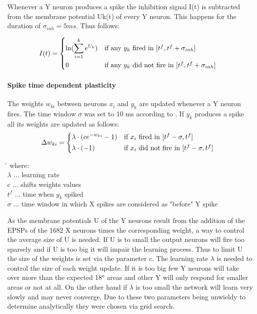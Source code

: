 Whenever a Y neuron produces a spike the inhibition signal I(t) is subtracted from the membrane potential Uk(t) of every Y neuron. This happens for the duration of $\sigma_{inh} = 5 ms$. Thus follows:

\begin{equation}
\label{eqn:iinh}
I(t) = \begin{dcases*} \ln ( \sum_{i=1}^k e^{U_k} ) & if any $y_k$ fired in $ [t^f, t^f  + \sigma_{inh}] $ \\
0 & \text{if any $y_k$ did not fire in $ [t^f, t^f + \sigma_{inh}] $ } \end{dcases*}\end{equation}

\paragraph{Spike time dependent plasticity}
The weights $w_{ki}$ between neurons $x_i$ and $y_k$ are updated whenever a Y neuron fires. The time window $\sigma$ was set to 10 ms according to \citet{nessler}. If $y_k$ produces a spike all its weights are updated as follows:
\begin{equation}
\label{deltawki}
\Delta w_{ki} = \begin{dcases*} \lambda \cdot (ce^{-w_{ki}} - 1) & if $x_{i}$ fired in $ [t^f - \sigma, t^f] $ \\
\lambda \cdot (-1) & \text{if $ x_i $ did not fire in $ [t^f - \sigma, t^f] $ } \end{dcases*}
\end{equation}
\begin{tabbing}
\phantom{$c\ $}\= \kill
where:\> \\
$\lambda$\> ... learning rate \\
c\> ... shifts weights values \\
$t^f$\> ... time when $y_k$ spiked \\
$\sigma$ ... time window in which X spikes are considered as "before" Y spike
\end{tabbing}
As the membrane potentials U of the Y neurons result from the addition of the EPSPs of the 1682 X neurons times the corresponding weight, a way to control the average size of U is needed. If U is to small the output neurons will fire too sparsely and if U is too big it will impair the learning process. Thus to limit U the size of the weights is set via the parameter c. The learning rate $\lambda$ is needed to control the size of each weight update. If it is too big few Y neurons will take over more than the expected 18° areas and other Y will only respond for smaller areas or not at all. On the other hand if $\lambda$ is too small the network will learn very slowly and may never converge. Due to these two parameters being unwieldy to determine analytically they were chosen via grid search. 


